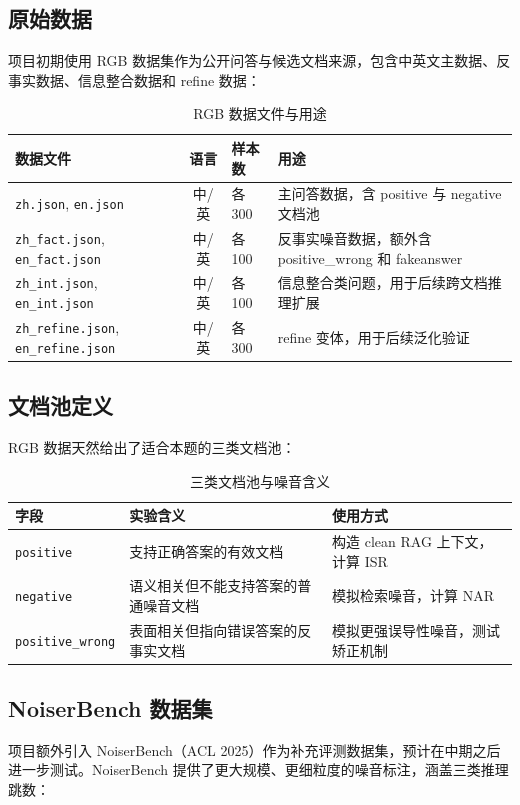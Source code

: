 \documentclass[UTF8,zihao=-4]{ctexart}
\begin{document}
\subsection{原始数据}
项目初期使用 RGB 数据集作为公开问答与候选文档来源，包含中英文主数据、反事实数据、信息整合数据和 refine 数据：

\begin{table}[H]
  \centering
  \caption{RGB 数据文件与用途}
  \begin{tabularx}{\textwidth}{lclY}
    \toprule
    数据文件 & 语言 & 样本数 & 用途 \\
    \midrule
    \texttt{zh.json}, \texttt{en.json} & 中/英 & 各 300 & 主问答数据，含 positive 与 negative 文档池 \\
    \texttt{zh\_fact.json}, \texttt{en\_fact.json} & 中/英 & 各 100 & 反事实噪音数据，额外含 positive\_wrong 和 fakeanswer \\
    \texttt{zh\_int.json}, \texttt{en\_int.json} & 中/英 & 各 100 & 信息整合类问题，用于后续跨文档推理扩展 \\
    \texttt{zh\_refine.json}, \texttt{en\_refine.json} & 中/英 & 各 300 & refine 变体，用于后续泛化验证 \\
    \bottomrule
  \end{tabularx}
\end{table}

\subsection{文档池定义}
RGB 数据天然给出了适合本题的三类文档池：

\begin{table}[H]
  \centering
  \caption{三类文档池与噪音含义}
  \begin{tabularx}{\textwidth}{lYY}
    \toprule
    字段 & 实验含义 & 使用方式 \\
    \midrule
    \texttt{positive} & 支持正确答案的有效文档 & 构造 clean RAG 上下文，计算 ISR \\
    \texttt{negative} & 语义相关但不能支持答案的普通噪音文档 & 模拟检索噪音，计算 NAR \\
    \texttt{positive\_wrong} & 表面相关但指向错误答案的反事实文档 & 模拟更强误导性噪音，测试矫正机制 \\
    \bottomrule
  \end{tabularx}
\end{table}

\subsection{NoiserBench 数据集}
项目额外引入 NoiserBench（ACL 2025）作为补充评测数据集，预计在中期之后进一步测试。NoiserBench 提供了更大规模、更细粒度的噪音标注，涵盖三类推理跳数：
\end{document}
